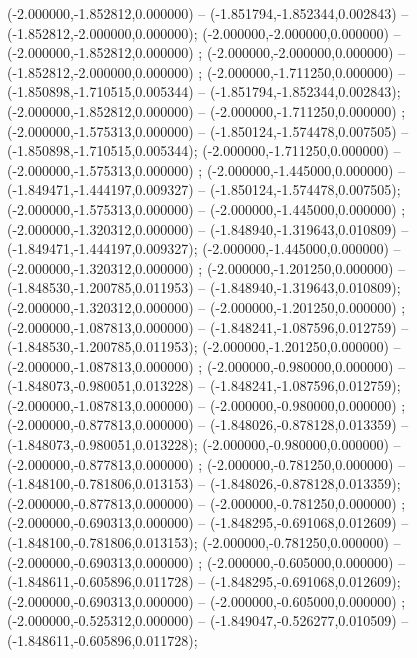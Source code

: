  (-2.000000,-1.852812,0.000000) -- (-1.851794,-1.852344,0.002843) -- (-1.852812,-2.000000,0.000000);
 (-2.000000,-2.000000,0.000000) -- (-2.000000,-1.852812,0.000000) ;
 (-2.000000,-2.000000,0.000000) -- (-1.852812,-2.000000,0.000000) ;
 (-2.000000,-1.711250,0.000000) -- (-1.850898,-1.710515,0.005344) -- (-1.851794,-1.852344,0.002843);
 (-2.000000,-1.852812,0.000000) -- (-2.000000,-1.711250,0.000000) ;
 (-2.000000,-1.575313,0.000000) -- (-1.850124,-1.574478,0.007505) -- (-1.850898,-1.710515,0.005344);
 (-2.000000,-1.711250,0.000000) -- (-2.000000,-1.575313,0.000000) ;
 (-2.000000,-1.445000,0.000000) -- (-1.849471,-1.444197,0.009327) -- (-1.850124,-1.574478,0.007505);
 (-2.000000,-1.575313,0.000000) -- (-2.000000,-1.445000,0.000000) ;
 (-2.000000,-1.320312,0.000000) -- (-1.848940,-1.319643,0.010809) -- (-1.849471,-1.444197,0.009327);
 (-2.000000,-1.445000,0.000000) -- (-2.000000,-1.320312,0.000000) ;
 (-2.000000,-1.201250,0.000000) -- (-1.848530,-1.200785,0.011953) -- (-1.848940,-1.319643,0.010809);
 (-2.000000,-1.320312,0.000000) -- (-2.000000,-1.201250,0.000000) ;
 (-2.000000,-1.087813,0.000000) -- (-1.848241,-1.087596,0.012759) -- (-1.848530,-1.200785,0.011953);
 (-2.000000,-1.201250,0.000000) -- (-2.000000,-1.087813,0.000000) ;
 (-2.000000,-0.980000,0.000000) -- (-1.848073,-0.980051,0.013228) -- (-1.848241,-1.087596,0.012759);
 (-2.000000,-1.087813,0.000000) -- (-2.000000,-0.980000,0.000000) ;
 (-2.000000,-0.877813,0.000000) -- (-1.848026,-0.878128,0.013359) -- (-1.848073,-0.980051,0.013228);
 (-2.000000,-0.980000,0.000000) -- (-2.000000,-0.877813,0.000000) ;
 (-2.000000,-0.781250,0.000000) -- (-1.848100,-0.781806,0.013153) -- (-1.848026,-0.878128,0.013359);
 (-2.000000,-0.877813,0.000000) -- (-2.000000,-0.781250,0.000000) ;
 (-2.000000,-0.690313,0.000000) -- (-1.848295,-0.691068,0.012609) -- (-1.848100,-0.781806,0.013153);
 (-2.000000,-0.781250,0.000000) -- (-2.000000,-0.690313,0.000000) ;
 (-2.000000,-0.605000,0.000000) -- (-1.848611,-0.605896,0.011728) -- (-1.848295,-0.691068,0.012609);
 (-2.000000,-0.690313,0.000000) -- (-2.000000,-0.605000,0.000000) ;
 (-2.000000,-0.525312,0.000000) -- (-1.849047,-0.526277,0.010509) -- (-1.848611,-0.605896,0.011728);

